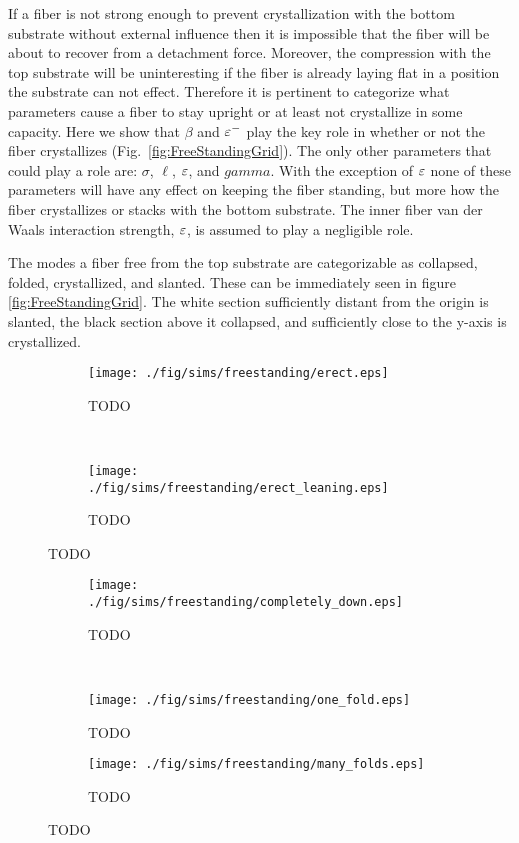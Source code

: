 If a fiber is not strong enough to prevent crystallization with the bottom substrate without external influence then it is impossible that the fiber will be about to recover from a detachment force. Moreover, the compression with the top substrate will be uninteresting if the fiber is already laying flat in a position the substrate can not effect. Therefore it is pertinent to categorize what parameters cause a fiber to stay upright or at least not crystallize in some capacity. Here we show that $\beta$ and $\varepsilon^-$ play the key role in whether or not the fiber crystallizes (Fig.~\ref{fig:FreeStandingGrid}). The only other parameters that could play a role are: $\sigma$, $\ell$, $\varepsilon$, and $gamma$. With the exception of $\varepsilon$ none of these parameters will have any effect on keeping the fiber standing, but more how the fiber crystallizes or stacks with the bottom substrate. The inner fiber van der Waals interaction strength, $\varepsilon$, is assumed to play a negligible role.

The modes a fiber free from the top substrate are categorizable as collapsed, folded, crystallized, and slanted. These can be immediately seen in figure \ref{fig:FreeStandingGrid}. The white section sufficiently distant from the origin is slanted, the black section above it collapsed, and sufficiently close to the y-axis is crystallized.

	\begin{figure*}
		\centering
		\begin{subfigure}{.5\textwidth}
			\centering
			\texttt{[image: ./fig/sims/freestanding/erect.eps]}
			\caption{TODO \label{subfig:fs_erect}}
		\end{subfigure}%
		~
		\begin{subfigure}{.5\textwidth}
			\centering
			\texttt{[image: ./fig/sims/freestanding/erect\_leaning.eps]}
			\caption{TODO\label{subfig:fs_erectlean}}
		\end{subfigure}
		\caption{TODO\label{fig:fs_erect}}
	\end{figure*}
	
	\begin{figure*}
		\centering
		\begin{subfigure}{.5\textwidth}
			\centering
			\texttt{[image: ./fig/sims/freestanding/completely\_down.eps]}
			\caption{TODO \label{subfig:fs_down}}
		\end{subfigure}%
		~
		\begin{subfigure}{.5\textwidth}
			\centering
			\texttt{[image: ./fig/sims/freestanding/one\_fold.eps]}
			\caption{TODO \label{subfig:fs_onefold}}
		\end{subfigure}

		\begin{subfigure}{.5\textwidth}
			\centering
			\texttt{[image: ./fig/sims/freestanding/many\_folds.eps]}
			\caption{TODO \label{subfig:fs_manyfold}}
		\end{subfigure}		
		\caption{TODO\label{fig:fs_folds}}	
	\end{figure*}
	
